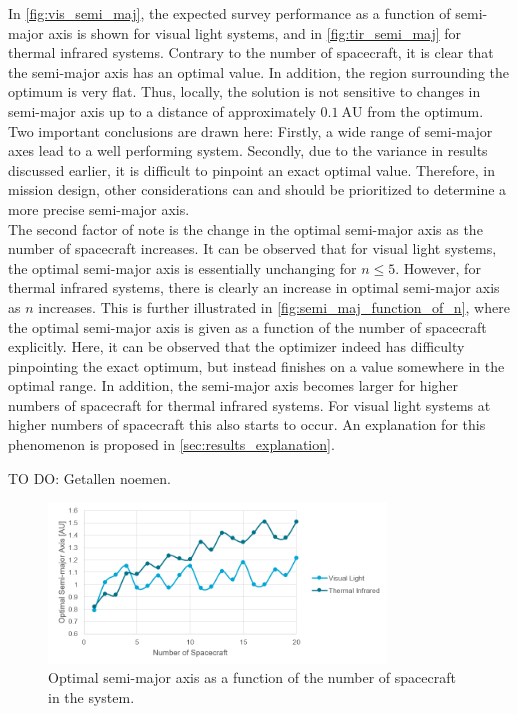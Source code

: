 In \autoref{fig:vis_semi_maj}, the expected survey performance as a function of semi-major axis is shown for visual light systems, and in \autoref{fig:tir_semi_maj} for thermal infrared systems. Contrary to the number of spacecraft, it is clear that the semi-major axis has an optimal value. In addition, the region surrounding the optimum is very flat. Thus, locally, the solution is not sensitive to changes in semi-major axis up to a distance of approximately $0.1~\mathrm{AU}$ from the optimum. Two important conclusions are drawn here: Firstly, a wide range of semi-major axes lead to a well performing system. Secondly, due to the variance in results discussed earlier, it is difficult to pinpoint an exact optimal value. Therefore, in mission design, other considerations can and should be prioritized to determine a more precise semi-major axis. \\

The second factor of note is the change in the optimal semi-major axis as the number of spacecraft increases. It can be observed that for visual light systems, the optimal semi-major axis is essentially unchanging for $n \leq 5$. However, for thermal infrared systems, there is clearly an increase in optimal semi-major axis as $n$ increases. This is further illustrated in \autoref{fig:semi_maj_function_of_n}, where the optimal semi-major axis is given as a function of the number of spacecraft explicitly. Here, it can be observed that the optimizer indeed has difficulty pinpointing the exact optimum, but instead finishes on a value somewhere in the optimal range. In addition, the semi-major axis becomes larger for higher numbers of spacecraft for thermal infrared systems. For visual light systems at higher numbers of spacecraft this also starts to occur. An explanation for this phenomenon is proposed in \autoref{sec:results_explanation}.

TO DO: Getallen noemen.

\begin{figure}[htbp]
 \centering
 \includegraphics[width=0.8\textwidth]{img/semi_maj_function_of_n.png}
 \caption{Optimal semi-major axis as a function of the number of spacecraft in the system.}
 \label{fig:semi_maj_function_of_n}
\end{figure}



